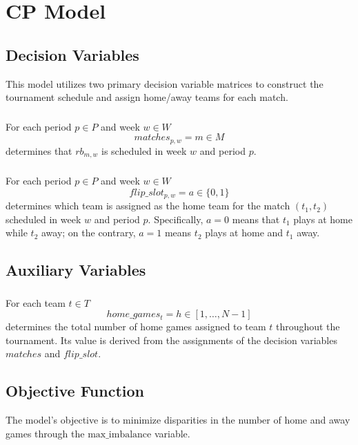 \section{CP Model}
\subsection{Decision Variables}
This model utilizes two primary decision variable matrices to construct the tournament schedule and assign home/away teams for each match.

\subsubsection{}
For each period $p \in P$ and week $w \in W$
$$
matches_{p,w}=m \in M
$$
determines that $rb_{m, w}$ is scheduled in week $w$ and period $p$.


\subsubsection{}  
For each period $p \in P$ and week $w \in W$  
$$  
flip\_slot_{p,w} = a \in \{0, 1\}  
$$  
determines which team is assigned as the home team for the match $(t_1, t_2)$ scheduled in week $w$ and period $p$. Specifically, $a = 0$ means that $t_1$ plays at home while $t_2$ away; on the contrary, $a = 1$ means $t_2$ plays at home and $t_1$ away.


\subsection{Auxiliary Variables}
\subsubsection{}  
For each team $t \in T$  
$$  
home\_games_{t} = h \in [1, \dots, N-1]  
$$  
determines the total number of home games assigned to team $t$ throughout the tournament. Its value is derived from the assignments of the decision variables $matches$ and $flip\_slot$.


\subsection{Objective Function}

The model's objective is to minimize disparities in the number of home and away games through the $\text{max\_imbalance}$ variable.

